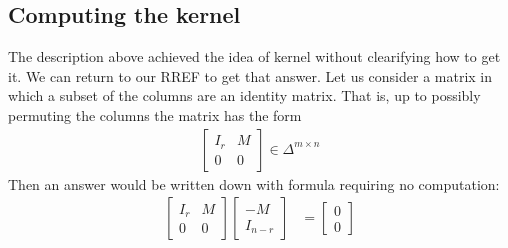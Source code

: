 \documentclass[12pt,twoside,dvipsnames,letterpaper]{memoir}
\begin{document}
\subsection{Computing the kernel}
The description above achieved the idea of kernel without clearifying 
how to get it.  We can return to our RREF to get that answer.
Let us consider a matrix in which a subset of the columns 
are an identity matrix.  That is, up to possibly permuting 
the columns the matrix has the form
\begin{align*}
    \begin{bmatrix}
        I_r & M \\ 
        0 & 0 
    \end{bmatrix}\in \Delta^{m\times n}
\end{align*}
Then an answer would be written down with formula 
requiring no computation:
\begin{align*}
    \begin{bmatrix}
        I_r & M \\ 
        0 & 0 
    \end{bmatrix}
    \begin{bmatrix}
        -M  \\ 
        I_{n-r} 
    \end{bmatrix}
    & = 
    \begin{bmatrix}
        0\\
        0
    \end{bmatrix}
\end{align*}
\end{document}
